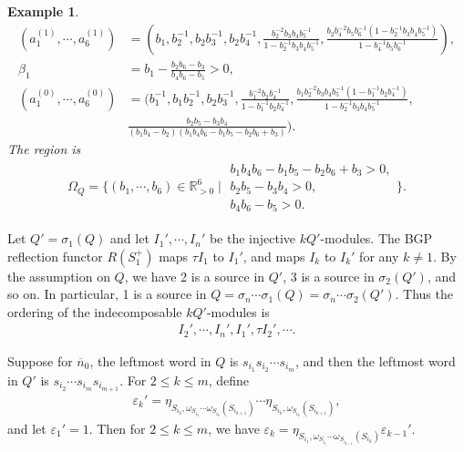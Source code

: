\documentclass[12pt]{amsart}
\newtheorem{example}[theorem]{Example}
\begin{document}
\begin{example}
\begin{align*}
        (a_1^{(1)},\cdots,a_6^{(1)})&=(b_1,b_2^{-1},b_2b_3^{-1},b_2b_4^{-1},\frac{b_2^{-2}b_3b_4b_5^{-1}}{1-b_2^{-1}b_3b_4b_5^{-1}},\frac{b_2b_4^{-2}b_5b_6^{-1}(1-b_2^{-1}b_3b_4b_5^{-1})}{1-b_4^{-1}b_5b_6^{-1}}),\\
        \beta_1&=b_1-\frac{b_2b_6-b_3}{b_4b_6-b_5}>0,\\
        (a_1^{(0)},\cdots,a_6^{(0)})&=(b_1^{-1},b_1b_2^{-1},b_2b_3^{-1},\frac{b_1^{-2}b_2b_4^{-1}}{1-b_1^{-1}b_2b_4^{-1}},\frac{b_1b_2^{-2}b_3b_4b_5^{-1}(1-b_1^{-1}b_2b_4^{-1})}{1-b_2^{-1}b_3b_4b_5^{-1}},\\
        &\frac{b_2b_5-b_3b_4}{(b_1b_4-b_2)(b_1b_4b_6-b_1b_5-b_2b_6+b_3)}).
    \end{align*}
    The region is 
    \begin{align*}
        \Omega_Q=\{(b_1,\cdots,b_6)\in \mathbb{R}_{>0}^6\mid
        \substack{b_1b_4b_6-b_1b_5-b_2b_6+b_3>0,\\b_2b_5-b_3b_4>0,\\b_4b_6-b_5>0.}  \}.
    \end{align*}
\end{example}


Let $Q'=\sigma_1(Q)$ and let $I_1',\cdots,I_n'$ be the injective $kQ'$-modules.
The BGP reflection functor $R(S_1^+)$ maps $\tau I_1$ to $I_1'$, and maps $I_k$ to $I_k'$ for any $k\neq 1$.
By the assumption on $Q$, we have 2 is a source in $Q'$, 3 is a source in $\sigma_2(Q')$, and so on.
In particular, 1 is a source in $Q=\sigma_n \cdots \sigma_1(Q)=\sigma_n \cdots \sigma_2(Q')$.
Thus the ordering of the indecomposable $kQ'$-modules is 
\begin{align*}
      I_2',\cdots,I_n',I_1',\tau I_2',\cdots.
\end{align*}

Suppose for $\overline{n}_0$, the leftmost word in $Q$ is $s_{i_1} s_{i_2}\cdots s_{i_m}$, and then the leftmost word in $Q'$ is $s_{i_2}\cdots s_{i_m}s_{i_{m+1}}$.
For $2\leq k \leq m$, define 
\begin{align*}
    \varepsilon_k' = \eta_{S_{i_{2}},\omega_{S_{i_{2}}}\cdots \omega_{S_{i_{k}}}(S_{i_{k+1}})}  \cdots \eta_{S_{i_{k}},\omega_{S_{i_{k}}}(S_{i_{k+1}})},
\end{align*}
and let $\varepsilon_1'=1$.
Then for $2\leq k \leq m$, we have $\varepsilon_k=\eta_{S_{i_1},\omega_{S_{i_1}}\cdots\omega_{S_{i_{k-1}}}(S_{i_k})}\varepsilon_{k-1}'$.
\end{document}
